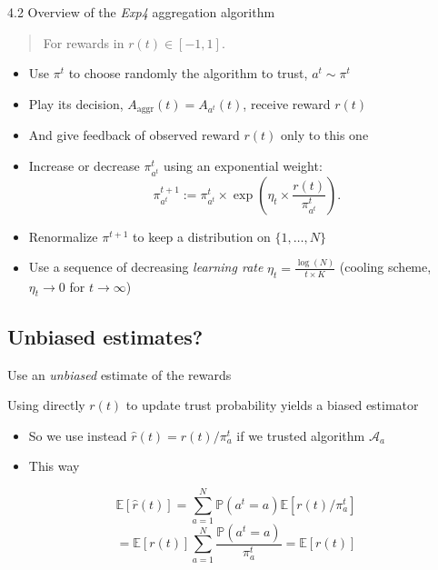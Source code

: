 \documentclass[12pt,english,ignorenonframetext,]{beamer}
\providecommand{\tightlist}{%
  \setlength{\itemsep}{0pt}\setlength{\parskip}{0pt}}
\begin{document}
\begin{frame}{4.2 Overview of the \emph{Exp4} aggregation algorithm}

\begin{quote}
For rewards in \(r(t) \in [-1,1]\).
\end{quote}

\begin{itemize}
\tightlist
\item
  Use \(\pi^t\) to choose randomly the algorithm to trust,
  \(a^t \sim \pi^t\)
\item
  Play its decision, \(A_{\text{aggr}}(t) = A_{a^t}(t)\), receive reward
  \(r(t)\)
\item
  And give feedback of observed reward \(r(t)\) only to this one
\item
  Increase or decrease \(\pi^t_{a^t}\) using an exponential weight:
  \[ \pi^{t+1}_{a^t} := \pi^{t}_{a^t} \times \exp\left(\eta_t \times \frac{r(t)}{\pi^t_{a^t}}\right).\]
\item
  Renormalize \(\pi^{t+1}\) to keep a distribution on \(\{1,\ldots,N\}\)
\item
  Use a sequence of decreasing \emph{learning rate}
  \(\eta_t = \frac{\log(N)}{t \times K}\) (cooling scheme,
  \(\eta_t \to 0\) for \(t\to\infty\))
\end{itemize}

\end{frame}



\subsection{\hfill{}Unbiased estimates?\hfill{}}

\begin{frame}{Use an \emph{unbiased} estimate of the rewards}

Using directly \(r(t)\) to update trust probability yields a biased
estimator

\begin{itemize}
\tightlist
\item
  So we use instead \(\hat{r}(t) = r(t) / \pi^t_{a}\) if we trusted
  algorithm \(\mathcal{A}_a\)
\item
  This way
\end{itemize}

\[\mathbb{E}[\hat{r}(t)] = \sum\limits_{a=1}^N \mathbb{P}(a^t = a) \mathbb{E}[r(t) / \pi^t_{a}]\]
\[= \mathbb{E}[r(t)] \sum\limits_{a=1}^N \frac{\mathbb{P}(a^t = a)}{\pi^t_{a}} = \mathbb{E}[r(t)]
\]

\end{frame}
\end{document}
